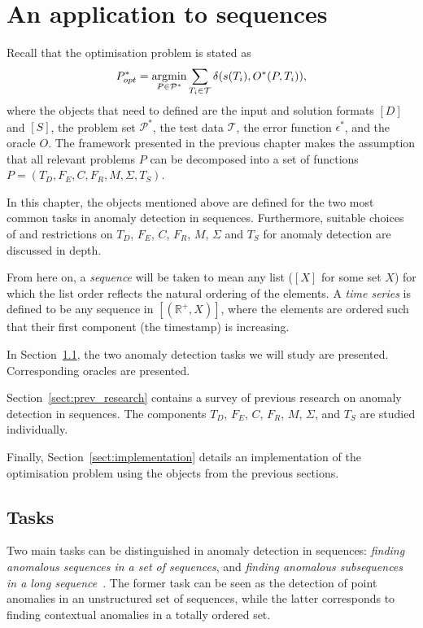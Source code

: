 \chapter{An application to sequences}
\label{ch:time_series}

Recall that the optimisation problem is stated as
\[
    P^*_{opt} = \argmin_{P \in \mathcal{P}^*} \sum_{T_i \in \mathcal{T}} \delta(s(T_i), O^*(P, T_i)),
\]
where the objects that need to defined are the input and solution formats $[D]$ and $[S]$, the problem set $\mathcal{P}^*$, the test data $\mathcal{T}$, the error function $\epsilon^*$, and the oracle $O$. The framework presented in the previous chapter makes the assumption that all relevant problems $P$ can be decomposed into a set of functions $P = (T_D, F_E, C, F_R, M, \Sigma, T_S)$.

In this chapter, the objects mentioned above are defined for the two most common tasks in anomaly detection in sequences. Furthermore, suitable choices of and restrictions on $T_D$, $F_E$, $C$, $F_R$, $M$, $\Sigma$ and $T_S$ for anomaly detection are discussed in depth.

From here on, a \emph{sequence} will be taken to mean any list ($[X]$ for some set $X$) for which the list order reflects the natural ordering of the elements. A \emph{time series} is defined to be any sequence in $[(\mathbb{R}^+, X)]$, where the elements are ordered such that their first component (the timestamp) is increasing.

In Section~\ref{sect:tasks}, the two anomaly detection tasks we will study are presented. Corresponding oracles are presented.

Section~\ref{sect:prev_research} contains a survey of previous research on anomaly detection in sequences. The components $T_D$, $F_E$, $C$, $F_R$, $M$, $\Sigma$, and $T_S$ are studied individually.

Finally, Section~\ref{sect:implementation} details an implementation of the optimisation problem using the objects from the previous sections.

\section{Tasks}
\label{sect:tasks}

Two main tasks can be distinguished in anomaly detection in sequences: \emph{finding anomalous sequences in a set of sequences}, and \emph{finding anomalous subsequences in a long sequence}~\cite{chandola}. The former task can be seen as the detection of point anomalies in an unstructured set of sequences, while the latter corresponds to finding contextual anomalies in a totally ordered set.

